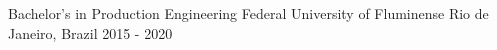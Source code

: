 \begin{cventries}
  \cventry
    {Bachelor's in Production Engineering} %
    {Federal University of Fluminense} %
    {Rio de Janeiro, Brazil} %
    {2015 - 2020} %
    {
      \begin{cvitems} %
      \end{cvitems}
    }

\end{cventries} 
